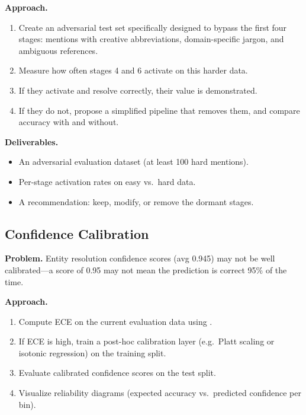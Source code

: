 \medskip\noindent\textbf{Approach.}

\begin{enumerate}
    \item Create an adversarial test set specifically designed to bypass
          the first four stages: mentions with creative abbreviations,
          domain-specific jargon, and ambiguous references.
    \item Measure how often stages 4 and 6 activate on this harder data.
    \item If they activate and resolve correctly, their value is
          demonstrated.
    \item If they do not, propose a simplified pipeline that removes them,
          and compare accuracy with and without.
\end{enumerate}

\medskip\noindent\textbf{Deliverables.}

\begin{itemize}
    \item An adversarial evaluation dataset (at least 100 hard mentions).
    \item Per-stage activation rates on easy vs.\ hard data.
    \item A recommendation: keep, modify, or remove the dormant stages.
\end{itemize}


\subsection{Confidence Calibration}
\label{sec:future-calibration}

\noindent\textbf{Problem.}
Entity resolution confidence scores (avg 0.945) may not be well
calibrated---a score of 0.95 may not mean the prediction is correct 95\%
of the time.

\medskip\noindent\textbf{Approach.}

\begin{enumerate}
    \item Compute ECE on the current evaluation data using
          .
    \item If ECE is high, train a post-hoc calibration layer (e.g.\
          Platt scaling or isotonic regression) on the training split.
    \item Evaluate calibrated confidence scores on the test split.
    \item Visualize reliability diagrams (expected accuracy vs.\ predicted
          confidence per bin).
\end{enumerate}

